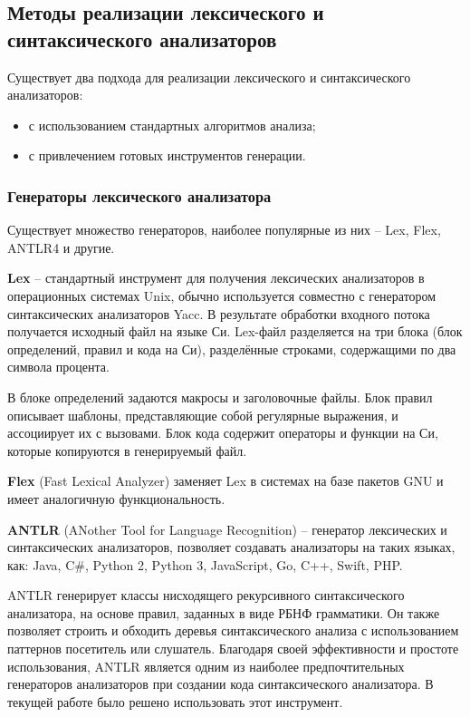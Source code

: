 \subsection{Методы реализации лексического и синтаксического анализаторов}
Существует два подхода для реализации лексического и синтаксического анализаторов:
\begin{itemize}
	\item с использованием стандартных алгоритмов анализа;
	
	\item с привлечением готовых инструментов генерации. \\
\end{itemize}

\subsubsection{Генераторы лексического анализатора}
Существует множество генераторов, наиболее популярные из них -- Lex, Flex, ANTLR4 и другие. 

\textbf{Lex} -- стандартный инструмент для получения лексических анализаторов в операционных системах Unix, обычно используется совместно с генератором синтаксических анализаторов Yacc. В результате обработки входного потока получается исходный файл на языке Си. Lex-файл разделяется на три блока (блок определений, правил и кода на Си), разделённые строками, содержащими по два символа процента. \cite{bib:lex}

В блоке определений задаются макросы и заголовочные файлы. Блок правил описывает шаблоны, представляющие собой регулярные выражения, и ассоциирует их с вызовами. Блок кода  содержит операторы и функции на Си, которые копируются в генерируемый файл.

\textbf{Flex} (Fast Lexical Analyzer) заменяет Lex в системах на базе пакетов GNU и имеет аналогичную функциональность. \cite{bib:flex}

\textbf{ANTLR} (ANother Tool for Language Recognition) -- генератор лексических и синтаксических анализаторов, позволяет создавать анализаторы на таких языках, как: Java, C\#, Python 2, Python 3, JavaScript, Go, C++, Swift, PHP. \cite{bib:antlr4}

ANTLR генерирует классы нисходящего рекурсивного синтаксического анализатора, на основе правил, заданных в виде РБНФ грамматики. Он также позволяет строить и обходить деревья синтаксического анализа с использованием паттернов посетитель или слушатель. Благодаря своей эффективности и
простоте использования, ANTLR является одним из наиболее предпочтительных генераторов анализаторов при создании кода синтаксического анализатора. В текущей работе было решено использовать этот инструмент. \\

